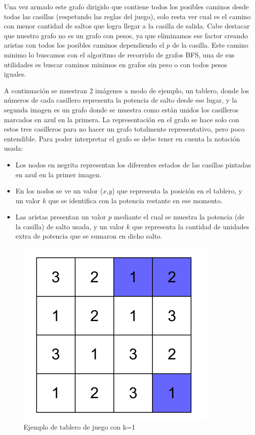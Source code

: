 Una vez armado este grafo dirigido que contiene todos los posibles caminos desde todas las casillas (respetando las reglas del juego), solo resta ver cual es el camino con menor cantidad de saltos que logra llegar a la casilla de salida. Cabe destacar que nuestro grafo no es un grafo con pesos, ya que eliminamos ese factor creando aristas con todos los posibles caminos dependiendo el $p$ de la casilla. Este camino minimo lo buscamos con el algoritmo de recorrido de grafos BFS, una de sus utilidades es buscar caminos minimos en grafos sin peso o con todos pesos iguales.


A continuaci\'on se muestran 2 im\'agenes a modo de ejemplo, un tablero, donde los n\'umeros de cada casillero representa la potencia de salto desde ese lugar, y la segunda imagen es un grafo donde se muestra como est\'an unidos los casilleros marcados en azul en la primera. La representaci\'on en el grafo se hace solo con estos tres casilleros para no hacer un grafo totalmente representativo, pero poco entendible.
Para poder interpretar el grafo se debe tener en cuenta la notaci\'on usada:
\begin{itemize}
\item Los nodos en negrita representan los diferentes estados de las casillas pintadas en azul en la primer imagen.
\item En los nodos se ve un valor ($x$,$y$) que representa la posici\'on en el tablero, y un valor $k$ que se identifica con la potencia restante en ese momento.
\item Las aristas presentan un valor $p$ mediante el cual se muestra la potencia (de la casilla) de salto usada, y un valor $k$ que representa la cantidad de unidades extra de potencia que se sumaron en dicho salto.
\end{itemize}

\begin{figure}[h]
\begin{center}
\includegraphics[scale=0.3]{./img/ej3_tablero.png}
\caption{Ejemplo de tablero de juego con k=1}
\end{center}
\end{figure}

